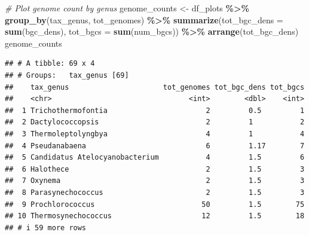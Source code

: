 \documentclass[
]{article}
\newenvironment{Shaded}{\begin{snugshade}}{\end{snugshade}}
\newcommand{\AttributeTok}[1]{\textcolor[rgb]{0.13,0.29,0.53}{#1}}
\newcommand{\CommentTok}[1]{\textcolor[rgb]{0.56,0.35,0.01}{\textit{#1}}}
\newcommand{\FunctionTok}[1]{\textcolor[rgb]{0.13,0.29,0.53}{\textbf{#1}}}
\newcommand{\NormalTok}[1]{#1}
\newcommand{\OtherTok}[1]{\textcolor[rgb]{0.56,0.35,0.01}{#1}}
\newcommand{\SpecialCharTok}[1]{\textcolor[rgb]{0.81,0.36,0.00}{\textbf{#1}}}
\begin{document}
\begin{Shaded}
\begin{Highlighting}[]
\CommentTok{\# Plot genome count by genus}
\NormalTok{genome\_counts }\OtherTok{\textless{}{-}}\NormalTok{ df\_plots }\SpecialCharTok{\%\textgreater{}\%}
  \FunctionTok{group\_by}\NormalTok{(tax\_genus, tot\_genomes) }\SpecialCharTok{\%\textgreater{}\%}
  \FunctionTok{summarize}\NormalTok{(}\AttributeTok{tot\_bgc\_dens =} \FunctionTok{sum}\NormalTok{(bgc\_dens), }\AttributeTok{tot\_bgcs =} \FunctionTok{sum}\NormalTok{(num\_bgcs)) }\SpecialCharTok{\%\textgreater{}\%}
  \FunctionTok{arrange}\NormalTok{(tot\_bgc\_dens)}
\NormalTok{genome\_counts}
\end{Highlighting}
\end{Shaded}

\begin{verbatim}
## # A tibble: 69 x 4
## # Groups:   tax_genus [69]
##    tax_genus                      tot_genomes tot_bgc_dens tot_bgcs
##    <chr>                                <int>        <dbl>    <int>
##  1 Trichothermofontia                       2         0.5         1
##  2 Dactylococcopsis                         2         1           2
##  3 Thermoleptolyngbya                       4         1           4
##  4 Pseudanabaena                            6         1.17        7
##  5 Candidatus Atelocyanobacterium           4         1.5         6
##  6 Halothece                                2         1.5         3
##  7 Oxynema                                  2         1.5         3
##  8 Parasynechococcus                        2         1.5         3
##  9 Prochlorococcus                         50         1.5        75
## 10 Thermosynechococcus                     12         1.5        18
## # i 59 more rows
\end{verbatim}
\end{document}

